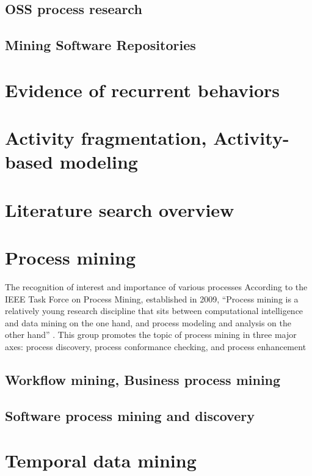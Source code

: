 \subsection{OSS process research}
\subsection{Mining Software Repositories}\label{background.msr.summary}


\section{Evidence of recurrent behaviors}

\section{Activity fragmentation, Activity-based modeling}\label{activity}

\section{Literature search overview}

\section{Process mining}
The recognition of interest and importance of various processes 
According to the IEEE Task Force on Process Mining, established in 2009, ``Process mining is 
a relatively young research discipline that sits between computational intelligence and data 
mining on the one hand, and process modeling and analysis on the other hand'' \cite{citeulike:11077707}.
This group promotes the topic of process mining in three major axes: process discovery,
process conformance checking, and process enhancement 

\subsection{Workflow mining, Business process mining}\label{mackground.bpm}


\subsection{Software process mining and discovery}\label{mackground.bpm}


\section{Temporal data mining}
